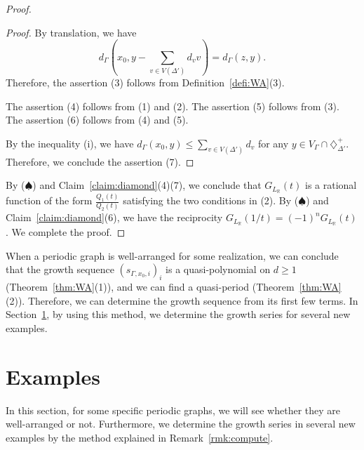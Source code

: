 \documentclass[ALCO,published]{cedram}
\theoremstyle{remark}
\begin{document}
\begin{proof}
\begin{proof}
By translation, we have 
\[
d_{\Gamma} \left( x_0, y - \sum _{v \in V(\Delta ')} d_v v \right)
= d_{\Gamma} (z, y). 
\]
Therefore, the assertion (3) follows from Definition~\ref{defi:WA}(3). 

The assertion (4) follows from (1) and (2). 
The assertion (5) follows from (3). 
The assertion (6) follows from (4) and (5). 

By the inequality (i), we have $d_{\Gamma}(x_0, y) \le \sum _{v \in V(\Delta ')} d_v$ for 
any $y \in V_{\Gamma} \cap \diamondsuit^+ _{\Delta '}$. 
Therefore, we conclude the assertion (7). 
\end{proof}
By ($\spadesuit$) and Claim~\ref{claim:diamond}(4)(7),
we conclude that $G_{L_{\mathbb{R}}}(t)$ is a rational function of the form 
$\frac{Q_1(t)}{Q_2(t)}$ satisfying the two conditions in (2). 
By ($\spadesuit$) and Claim~\ref{claim:diamond}(6), 
we have the reciprocity $G_{L_{\mathbb{R}}}(1/t) = (-1)^n G_{L_{\mathbb{R}}}(t)$. 
We complete the proof. 
\end{proof}

\begin{rmk}\label{rmk:compute}
When a periodic graph is well-arranged for some realization, 
we can conclude that the growth sequence $(s_{\Gamma, x_0, i})_i$ is a quasi-polynomial on $d \ge 1$ (Theorem~\ref{thm:WA}(1)), and we can find a quasi-period (Theorem~\ref{thm:WA}(2)). 
Therefore, we can determine the growth sequence from its first few terms. 
In Section~\ref{section:eg}, by using this method, we determine the growth series for several new examples. 
\end{rmk}

\section{Examples}\label{section:eg}
In this section, for some specific periodic graphs, we will see whether they are well-arranged or not. 
Furthermore, we determine the growth series in several new examples by the method explained in Remark~\ref{rmk:compute}. 
\end{document}
